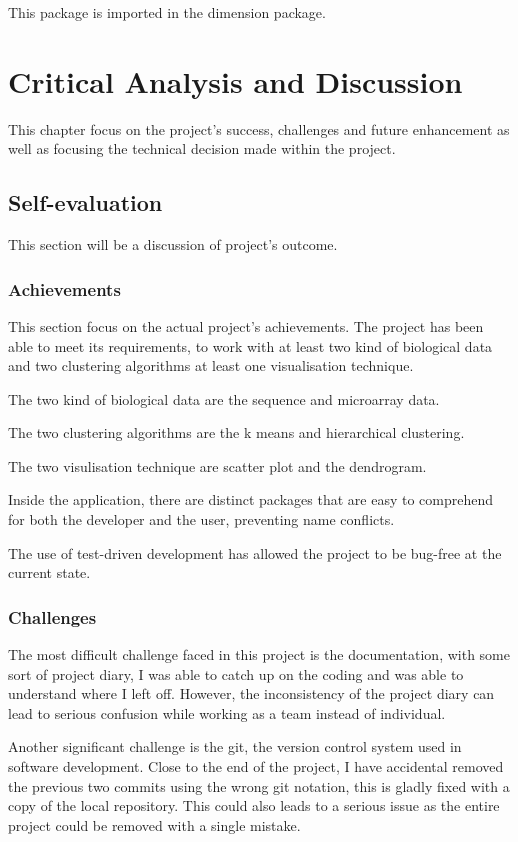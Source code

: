 \documentclass[]{final_report}
\begin{document}
This package is imported in the dimension package.

\chapter{Critical Analysis and Discussion}
This chapter focus on the project's success, challenges and future enhancement as well as focusing the technical decision made within the project.

\section{Self-evaluation}
This section will be a discussion of project's outcome.
\subsection{Achievements}
This section focus on the actual project's achievements.
The project has been able to meet its requirements, to work with at least two kind of biological data and two clustering algorithms at least one visualisation technique.

The two kind of biological data are the sequence and microarray data.

The two clustering algorithms are the k means and hierarchical clustering.

The two visulisation technique are scatter plot and the dendrogram.

Inside the application, there are distinct packages that are easy to comprehend for both the developer and the user, preventing name conflicts.

The use of test-driven development has allowed the project to be bug-free at the current state. 
\subsection{Challenges}
The most difficult challenge faced in this project is the documentation, with some sort of project diary, I was able to catch up on the coding and was able to understand where I left off. However, the inconsistency of the project diary can lead to serious confusion while working as a team instead of individual.

Another significant challenge is the git, the version control system used in software development. Close to the end of the project, I have accidental removed the previous two commits using the wrong git notation, this is gladly fixed with a copy of the local repository. This could also leads to a serious issue as the entire project could be removed with a single mistake.
\end{document}
